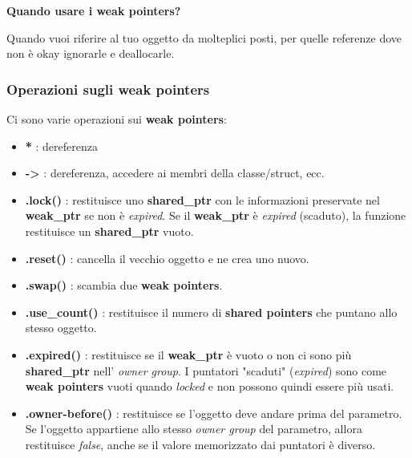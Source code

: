 \textsf{\small \textbf{Quando usare i weak pointers?}} \break

\textsf{\small Quando vuoi riferire al tuo oggetto da molteplici posti, per quelle referenze dove non è okay ignorarle e deallocarle.} \\


\subsubsection{Operazioni sugli weak pointers}

\textsf{\small Ci sono varie operazioni sui \textbf{weak pointers}: } \\

\begin{itemize}
	\item \textsf{\small \textbf{*} : dereferenza}
	\item \textsf{\small \textbf{->} : dereferenza, accedere ai membri della classe/struct, ecc.}
	\item \textsf{\small \textbf{.lock()} : restituisce uno \textbf{shared\_ptr} con le informazioni preservate nel \textbf{weak\_ptr} se non è \emph{expired}. Se il \textbf{weak\_ptr} è \emph{expired} (scaduto), la funzione restituisce un \textbf{shared\_ptr} vuoto.}
	\item \textsf{\small \textbf{.reset()} : cancella il vecchio oggetto e ne crea uno nuovo.}
	\item \textsf{\small \textbf{.swap()} : scambia due \textbf{weak pointers}.}
	\item \textsf{\small \textbf{.use\_count()} : restituisce il numero di \textbf{shared pointers} che puntano allo stesso oggetto.}
	\item \textsf{\small \textbf{.expired()} : restituisce se il \textbf{weak\_ptr} è vuoto o non ci sono più \textbf{shared\_ptr} nell' \emph{owner group}. I puntatori "scaduti" (\emph{expired}) sono come \textbf{weak pointers} vuoti quando \emph{locked} e non possono quindi essere più usati.}
	\item \textsf{\small \textbf{.owner-before()} : restituisce se l'oggetto deve andare prima del parametro. Se l'oggetto appartiene allo stesso \emph{owner group} del parametro, allora restituisce \emph{false}, anche se il valore memorizzato dai puntatori è diverso.}
\end{itemize}


